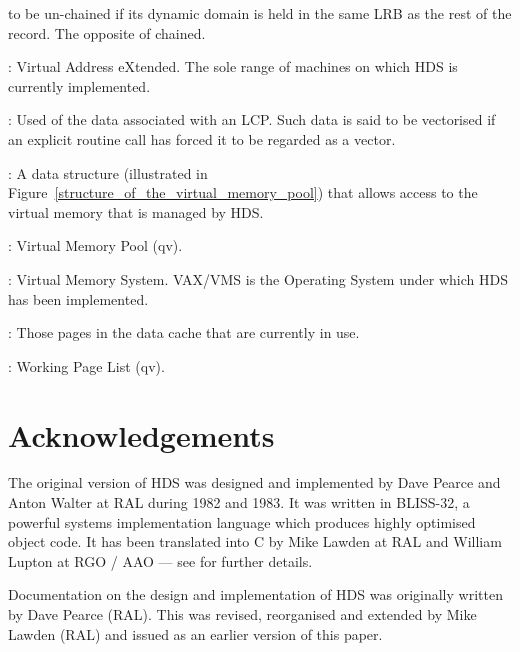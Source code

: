 \begin {description}
to be un-chained if its dynamic domain is held in the same LRB as the rest of
the record. The opposite of chained.
\item [VAX]: Virtual Address eXtended. The sole range of machines on which
HDS is currently implemented.
\item [Vectorised]: Used of the data associated with an LCP. Such data is said
to be vectorised if an explicit routine call has forced it to be regarded
as a vector.
\item [Virtual Memory Pool]: A data structure (illustrated in
Figure~\ref{structure_of_the_virtual_memory_pool}) that allows access to
the virtual memory that is managed by HDS.
\item [VMP]: Virtual Memory Pool (qv).
\item [VMS]: Virtual Memory System. VAX/VMS is the Operating System under
which HDS has been implemented.
\item [Working Page List]: Those pages in the data cache that are currently
in use.
\item [WPL]: Working Page List (qv).
\end {description}

\section* {Acknowledgements}
The original version of HDS was designed and implemented by Dave Pearce and
Anton Walter at RAL during 1982 and 1983. It was written in BLISS-32, a
powerful systems implementation language which produces highly optimised object
code. It has been translated into C by Mike Lawden at RAL and William Lupton at
RGO / AAO --- see \cite{lsn_32} for further details.

Documentation on the design and implementation of HDS was originally written
by Dave Pearce (RAL).
This was revised, reorganised and extended by Mike Lawden (RAL) and issued as
an earlier version of this paper.


